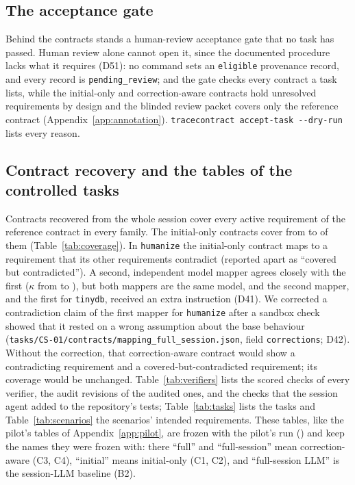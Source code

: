 \subsection{The acceptance gate}
\label{sec:gate}
Behind the contracts stands a human-review acceptance gate that no task has passed. Human review alone cannot open it,
since the documented procedure lacks what it requires (D51): no command sets an \texttt{eligible} provenance record, and
every record is \texttt{pending\_review}; and the gate checks every contract a task lists, while the initial-only and
correction-aware contracts hold unresolved requirements by design and the blinded review packet covers only the
reference contract (Appendix~\ref{app:annotation}). \texttt{tracecontract accept-task -{}-dry-run} lists every reason.

\subsection{Contract recovery and the tables of the controlled tasks}
\label{sec:recovery}
Contracts recovered from the whole session cover every active requirement of the reference contract in every family.
The initial-only contracts cover from  to  of them
(Table~\ref{tab:coverage}). In \texttt{humanize} the initial-only contract maps to a requirement that its other
requirements contradict (reported apart as ``covered but contradicted''). A second, independent model mapper agrees
closely with the first ($\kappa$ from  to ), but both mappers are the same model, and the
second mapper, and the first for \texttt{tinydb}, received an extra instruction (D41). We corrected a contradiction claim
of the first mapper for \texttt{humanize} after a sandbox check showed that it rested on a wrong assumption about the
base behaviour (\texttt{tasks/CS-01/contracts/mapping\_full\_session.json}, field \texttt{corrections}; D42). Without the
correction, that correction-aware contract would show a contradicting requirement and a covered-but-contradicted
requirement; its coverage would be unchanged. Table~\ref{tab:verifiers} lists the scored checks of every verifier, the
audit revisions of the audited ones, and the checks that the session agent added to the repository's tests;
Table~\ref{tab:tasks} lists the tasks and Table~\ref{tab:scenarios} the scenarios' intended requirements. These
tables, like the pilot's tables of Appendix~\ref{app:pilot}, are frozen with the pilot's run
() and keep the names they were frozen with: there ``full'' and
``full-session'' mean correction-aware (C3, C4), ``initial'' means initial-only (C1, C2), and ``full-session LLM'' is the
session-LLM baseline (B2).

